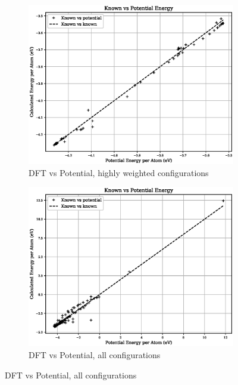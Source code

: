 \begin{figure}[htb]
\begin{subfigure}{.42\textwidth}
  \centering
  \includegraphics[width=.94\linewidth]{chapters/potentials_fe_pd_ru/fepd_potential/potential_known_energy_fit_set.eps}  
  \caption{DFT vs Potential, highly weighted configurations}
  \label{fig:fepd-energy-fit}
\end{subfigure}
\begin{subfigure}{.42\textwidth}
  \centering
  \includegraphics[width=.94\linewidth]{chapters/potentials_fe_pd_ru/fepd_potential/potential_known_energy_full_set.eps}  
  \caption{DFT vs Potential, all configurations}
  \label{fig:fepd-energy-full}
\end{subfigure}
\label{fig:fepd-energy}
\end{figure}

